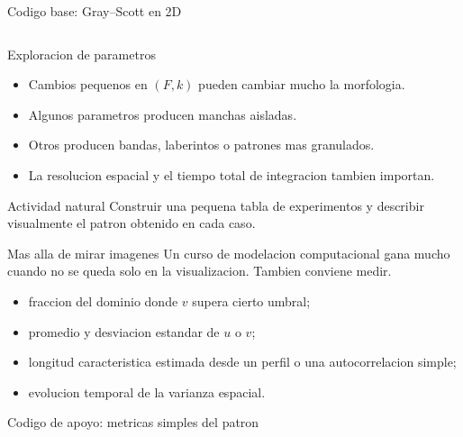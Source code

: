 \begin{frame}[fragile]{Codigo base: Gray--Scott en 2D}
\inputminted[firstline=1,lastline=77]{python}{codes/gray_scott.py}
\end{frame}

\begin{frame}{Exploracion de parametros}
\begin{itemize}
    \item Cambios pequenos en $(F,k)$ pueden cambiar mucho la morfologia.
    \item Algunos parametros producen manchas aisladas.
    \item Otros producen bandas, laberintos o patrones mas granulados.
    \item La resolucion espacial y el tiempo total de integracion tambien importan.
\end{itemize}

\begin{block}{Actividad natural}
Construir una pequena tabla de experimentos y describir visualmente el patron obtenido en cada caso.
\end{block}
\end{frame}

\begin{frame}{Mas alla de mirar imagenes}
\justifying
Un curso de modelacion computacional gana mucho cuando no se queda solo en la visualizacion. Tambien conviene medir.

\begin{itemize}
    \item fraccion del dominio donde $v$ supera cierto umbral;
    \item promedio y desviacion estandar de $u$ o $v$;
    \item longitud caracteristica estimada desde un perfil o una autocorrelacion simple;
    \item evolucion temporal de la varianza espacial.
\end{itemize}
\end{frame}

\begin{frame}[fragile]{Codigo de apoyo: metricas simples del patron}
\inputminted[firstline=1,lastline=30]{python}{codes/pattern_metrics.py}
\end{frame}


